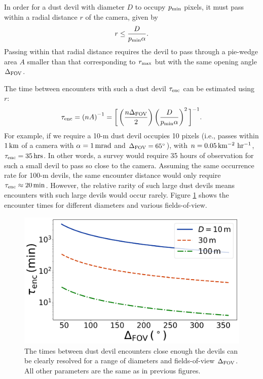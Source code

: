 \documentclass{aastex63}
\begin{document}
In order for a dust devil with diameter $D$ to occupy $p_{\rm min}$ pixels, it must pass within a radial distance $r$ of the camera, given by 
\begin{equation}
    r \le \frac{D}{p_{\rm min} \alpha}.
    \label{eqn:encounter_distance}
\end{equation}
Passing within that radial distance requires the devil to pass through a pie-wedge area $A$ smaller than that corresponding to $r_{\rm max}$ but with the same opening angle $\Delta_{\rm FOV}$.

The time between encounters with such a dust devil $\tau_{\rm enc}$ can be estimated using $r$:
\begin{equation}
    \tau_{\rm enc} = \left( n A \right)^{-1} = \bigg[ \left( \frac{n \Delta_{\rm FOV}}{2} \right) \left( \frac{D}{p_{\rm min} \alpha } \right)^2 \bigg]^{-1}.
    \label{eqn:tau}
\end{equation}
For example, if we require a 10-m dust devil occupies 10 pixels (i.e., passes within $1\,{\rm km}$ of a camera with $\alpha = 1\,{\rm mrad}$ and $\Delta_{\rm FOV} = 65^\circ$), with $n = 0.05\,{\rm km^{-2}\ hr^{-1}}$, $\tau_{\rm enc} = 35\,{\rm hrs}$. In other words, a survey would require 35 hours of observation for such a small devil to pass so close to the camera. Assuming the same occurrence rate for 100-m devils, the same encounter distance would only require $\tau_{\rm enc} \approx 20\,{\rm min}$. However, the relative rarity of such large dust devils means encounters with such large devils would occur rarely. Figure \ref{fig:encounter_time} shows the encounter times for different diameters and various fields-of-view.

\begin{figure}
    \centering
    \includegraphics[width=\textwidth]{figures/encounter_time.jpg}
    \caption{The times between dust devil encounters close enough the devils can be clearly resolved for a range of diameters and fields-of-view $\Delta_{\rm FOV}$. All other parameters are the same as in previous figures.}
    \label{fig:encounter_time}
\end{figure}
\end{document}
